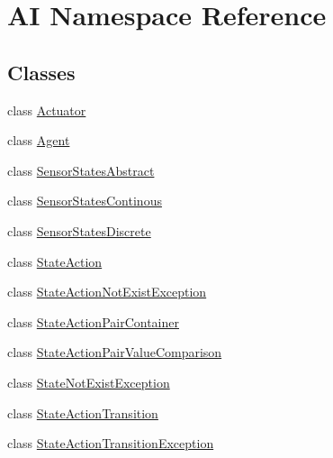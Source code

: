 \hypertarget{namespaceAI}{\section{A\-I Namespace Reference}
\label{namespaceAI}
}
\subsection*{Classes}
\begin{DoxyCompactItemize}
\item 
class \hyperlink{classAI_1_1Actuator}{Actuator}
\item 
class \hyperlink{classAI_1_1Agent}{Agent}
\item 
class \hyperlink{classAI_1_1SensorStatesAbstract}{Sensor\-States\-Abstract}
\item 
class \hyperlink{classAI_1_1SensorStatesContinous}{Sensor\-States\-Continous}
\item 
class \hyperlink{classAI_1_1SensorStatesDiscrete}{Sensor\-States\-Discrete}
\item 
class \hyperlink{classAI_1_1StateAction}{State\-Action}
\item 
class \hyperlink{classAI_1_1StateActionNotExistException}{State\-Action\-Not\-Exist\-Exception}
\item 
class \hyperlink{classAI_1_1StateActionPairContainer}{State\-Action\-Pair\-Container}
\item 
class \hyperlink{classAI_1_1StateActionPairValueComparison}{State\-Action\-Pair\-Value\-Comparison}
\item 
class \hyperlink{classAI_1_1StateNotExistException}{State\-Not\-Exist\-Exception}
\item 
class \hyperlink{classAI_1_1StateActionTransition}{State\-Action\-Transition}
\item 
class \hyperlink{classAI_1_1StateActionTransitionException}{State\-Action\-Transition\-Exception}
\end{DoxyCompactItemize}
